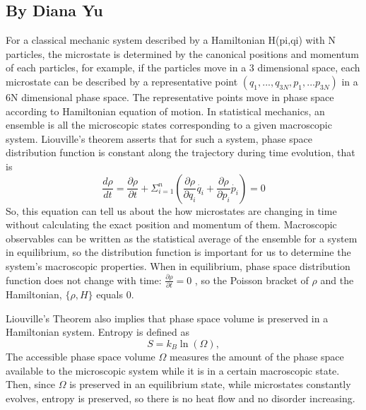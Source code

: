 \subsection{By Diana Yu}
For a classical mechanic system described by a Hamiltonian H(pi,qi) with N particles, the microstate is determined by the canonical positions and momentum of each particles, for example, if the particles move in a 3 dimensional space, each microstate can be described by a representative point $(q_{1},...,q_{3N},p_{1},...p_{3N})$ in a 6N dimensional phase space. The representative points move in phase space according to Hamiltonian equation of motion. In statistical mechanics, an ensemble is all the microscopic states corresponding to a given macroscopic system. Liouville’s theorem asserts that for such a system, phase space distribution function is constant along the trajectory during time evolution, that is
\begin{equation}
\frac{d\rho}{dt} = \frac{\partial\rho}{\partial t} + \Sigma_{i = 1}^{n}(\frac{\partial\rho}{\partial q_{i}}\dot{q_{i}}+\frac{\partial\rho}{\partial p_{i}}\dot{p_{i}}) = 0
\end{equation}
So, this equation can tell us about the how microstates are changing in time without calculating the exact position and momentum of them. Macroscopic observables can be written as the statistical average of the ensemble for a system in equilibrium, so the distribution function is important for us to determine the system’s macroscopic properties. When in equilibrium, phase space distribution function does not change with time: $\frac{\partial\rho}{\partial t} = 0$
, so the Poisson bracket of $\rho$ and the Hamiltonian, $\{\rho, H\}$ equals 0.

Liouville’s Theorem also implies that phase space volume is preserved in a Hamiltonian system.
Entropy is defined as
\begin{equation}
	S = k_B\ln(\Omega),
	\label{eqS}
\end{equation}
The accessible phase space volume $\Omega$ measures the amount of the phase space available to the microscopic system while it is in a certain macroscopic state. Then, since $\Omega$ is preserved in an equilibrium state, while microstates constantly evolves, entropy is preserved, so there is no heat flow and no disorder increasing.
